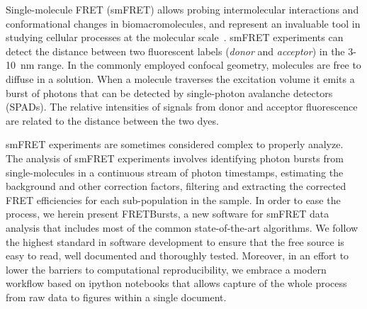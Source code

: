 Single-molecule FRET (smFRET) allows probing intermolecular interactions
and conformational changes in biomacromolecules, and represent an 
invaluable tool in studying cellular processes at the molecular 
scale~\cite{Kapanidis_2006}. smFRET experiments can detect the distance between 
two fluorescent labels (\textit{donor} and \textit{acceptor}) in the 
3-10~nm range. In the commonly employed confocal geometry, molecules are free 
to diffuse in a solution. When a molecule traverses the excitation volume it 
emits a burst of photons that can be detected by single-photon avalanche detectors (SPADs). 
The relative intensities of signals from donor and acceptor fluorescence 
are related to the distance between the two dyes.

smFRET experiments are sometimes considered complex to properly analyze. 
The analysis of smFRET experiments involves identifying photon bursts from 
single-molecules in a continuous stream of photon timestamps, estimating the 
background and other correction factors, filtering and extracting the corrected 
FRET efficiencies for each sub-population in the sample. In order to ease 
the process, we herein present FRETBursts, a new software for smFRET data 
analysis that includes most of the common state-of-the-art algorithms. 
We follow the highest standard in software development to ensure that 
the free source is easy to read, well documented and thoroughly tested. 
Moreover, in an effort to lower the barriers to computational reproducibility, 
we embrace a modern workflow based on ipython notebooks that allows capture 
of the whole process from raw data to figures within a single document.
